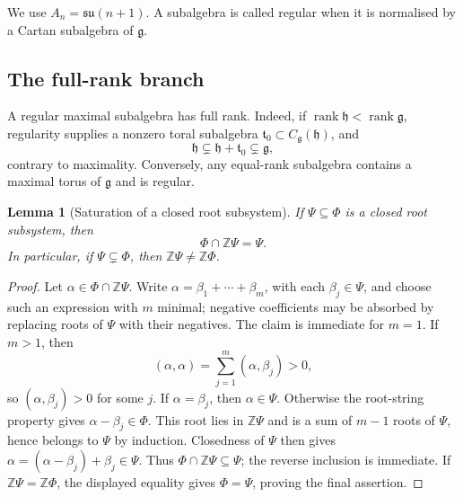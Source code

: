 \documentclass[11pt]{article}
\newtheorem{lemma}[theorem]{Lemma}
\theoremstyle{remark}
\newcommand{\g}{\mathfrak g}
\newcommand{\h}{\mathfrak h}
\newcommand{\su}{\mathfrak{su}}
\begin{document}
We use \(A_n=\su(n+1)\).  A subalgebra is called regular when it is normalised
by a Cartan subalgebra of \(\g\).

\subsection{The full-rank branch}

A regular maximal subalgebra has full rank.  Indeed, if
\(\operatorname{rank}\h<\operatorname{rank}\g\), regularity supplies a
nonzero toral subalgebra \(\mathfrak t_0\subset C_\g(\h)\), and
\[
 \h\subsetneq \h+\mathfrak t_0\subsetneq\g,
\]
contrary to maximality.  Conversely, any equal-rank subalgebra contains a
maximal torus of \(\g\) and is regular.

\begin{lemma}[Saturation of a closed root subsystem]
\label{lem:closed-subsystem-saturation}
If \(\Psi\subseteq\Phi\) is a closed root subsystem, then
\[
 \Phi\cap\mathbb Z\Psi=\Psi.
\]
In particular, if \(\Psi\subsetneq\Phi\), then
\(\mathbb Z\Psi\ne\mathbb Z\Phi\).
\end{lemma}
\begin{proof}
Let \(\alpha\in\Phi\cap\mathbb Z\Psi\).  Write
\(\alpha=\beta_1+\cdots+\beta_m\), with each \(\beta_j\in\Psi\), and choose
such an expression with \(m\) minimal; negative coefficients may be absorbed
by replacing roots of \(\Psi\) with their negatives.  The claim is immediate
for \(m=1\).  If \(m>1\), then
\[
 (\alpha,\alpha)=\sum_{j=1}^m(\alpha,\beta_j)>0,
\]
so \((\alpha,\beta_j)>0\) for some \(j\).  If \(\alpha=\beta_j\), then
\(\alpha\in\Psi\).  Otherwise the root-string property gives
\(\alpha-\beta_j\in\Phi\).  This root lies in \(\mathbb Z\Psi\) and is a sum
of \(m-1\) roots of \(\Psi\), hence belongs to \(\Psi\) by induction.
Closedness of \(\Psi\) then gives
\(\alpha=(\alpha-\beta_j)+\beta_j\in\Psi\).  Thus
\(\Phi\cap\mathbb Z\Psi\subseteq\Psi\); the reverse inclusion is immediate.
If \(\mathbb Z\Psi=\mathbb Z\Phi\), the displayed equality gives
\(\Phi=\Psi\), proving the final assertion.
\end{proof}
\end{document}
